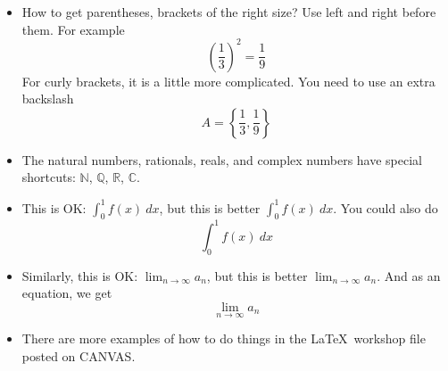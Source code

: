 \documentclass[11pt]{amsart}
\newcommand{\C}{\mathbb{C}}
\newcommand{\R}{\mathbb{R}}
\newcommand{\N}{\mathbb{N}}
\newcommand{\Q}{\mathbb{Q}}
\newcommand{\ds}[1]{\displaystyle{ #1}}
\begin{document}
\begin{itemize}
\item How to get parentheses, brackets of the right size? Use left and right before them. For example
\[
\left(\frac{1}{3}\right)^2 =\frac{1}{9}
\]
For curly brackets, it is a little more complicated. You need to use an extra backslash
\[
A = \left\{   \frac{1}{3}, \frac{1}{9}    \right\}
\]

\item The natural numbers, rationals, reals, and complex numbers have special shortcuts: $\N$, $\Q$, $\R$, $\C$.

\item This is OK: $\int_0^1 f(x) \ dx$, but this is better $\ds{\int_0^1 f(x) \ dx}$. You could also do
\[
\int_0^1 f(x) \ dx
\]

\item Similarly,  this is OK: $\lim_{n\to \infty} a_n$, but this is better $\displaystyle{\lim_{n\to \infty} a_n}$. And as an equation, we get
\[
\lim_{n\to \infty} a_n
\]

\item There are more examples of how to do things in the \LaTeX \ workshop file posted on CANVAS.
\end{itemize}
\end{document}
